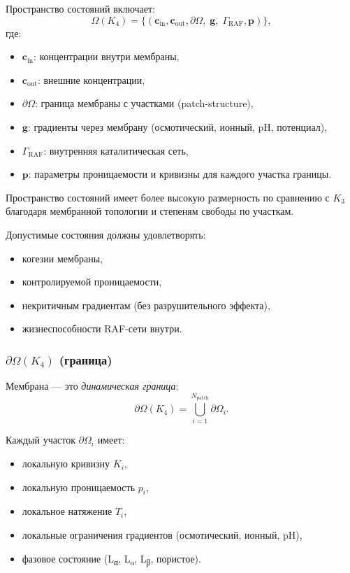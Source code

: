 Пространство состояний включает:
\[
\Omega(K_4) =
\{(\mathbf{c}_{\mathrm{in}},\mathbf{c}_{\mathrm{out}},
  \partial\Omega,\; \mathbf{g},\; \Gamma_{\mathrm{RAF}},
  \mathbf{p})\},
\]
где:
\begin{itemize}
    \item $\mathbf{c}_{\mathrm{in}}$: концентрации внутри мембраны,
    \item $\mathbf{c}_{\mathrm{out}}$: внешние концентрации,
    \item $\partial\Omega$: граница мембраны с участками (patch-structure),
    \item $\mathbf{g}$: градиенты через мембрану (осмотический, ионный,
          pH, потенциал),
    \item $\Gamma_{\mathrm{RAF}}$: внутренняя каталитическая сеть,
    \item $\mathbf{p}$: параметры проницаемости и кривизны для каждого
          участка границы.
\end{itemize}

Пространство состояний имеет более высокую размерность по сравнению с $K_3$
благодаря мембранной топологии и степеням свободы по участкам.

Допустимые состояния должны удовлетворять:
\begin{itemize}
    \item когезии мембраны,
    \item контролируемой проницаемости,
    \item некритичным градиентам (без разрушительного эффекта),
    \item жизнеспособности RAF-сети внутри.
\end{itemize}

\subsubsection{\texorpdfstring{$\partial\Omega(K_4)$}{\partial\Omega(K_4)} (граница)}

Мембрана — это \emph{динамическая граница}:
\[
\partial\Omega(K_4) = \bigcup_{i=1}^{N_{\mathrm{patch}}}
    \partial\Omega_i.
\]

Каждый участок $\partial\Omega_i$ имеет:
\begin{itemize}
    \item локальную кривизну $K_i$,
    \item локальную проницаемость $p_i$,
    \item локальное натяжение $T_i$,
    \item локальные ограничения градиентов (осмотический, ионный, pH),
    \item фазовое состояние (L\textsubscript{α}, L\textsubscript{o},
          L\textsubscript{β}, пористое).
\end{itemize}


